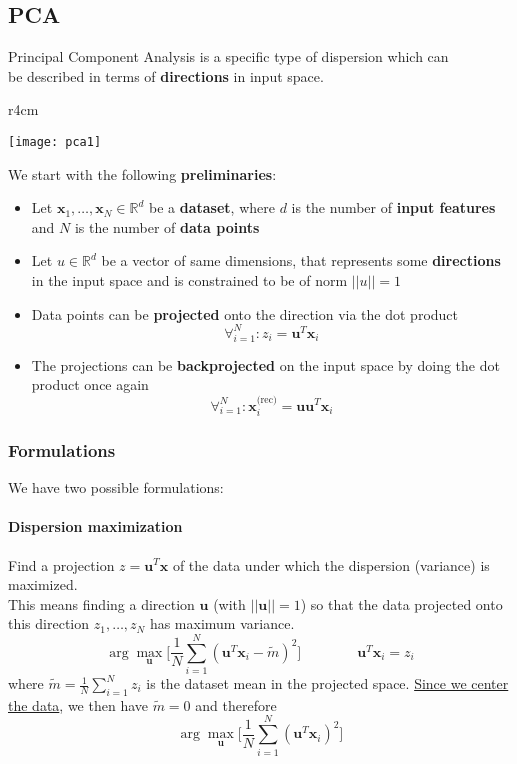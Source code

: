 \subsection{PCA}
Principal Component Analysis is a specific type of dispersion which can\\ be described in terms of \textbf{directions} in input space.\\
\begin{wrapfigure}[10]{r}{4cm}
	\vspace{-2.5cm}
	\begin{center}
		\texttt{[image: pca1]}
	\end{center}
\end{wrapfigure}
We start with the following \textbf{preliminaries}:
\begin{itemize}
	\item Let $\mathbf{x}_1, \ldots, \mathbf{x}_N \in \mathbb{R}^d$ be a \textbf{dataset}, where $d$ is the number of \textbf{input features} and $N$ is the number of \textbf{data points}
	\item Let $u \in \mathbb{R}^d$ be a vector of same dimensions, that represents some \textbf{directions} in the input space and is constrained to be of norm $\lvert\lvert u \rvert\rvert = 1$
	\item Data points can be \textbf{projected} onto the direction via the dot product
	\begin{equation}
		\forall_{i=1}^N : z_i = \mathbf{u}^T \mathbf{x}_i
	\end{equation}
	\item The projections can be \textbf{backprojected} on the input space by doing the dot product once again
	\begin{equation}
		\forall_{i=1}^N: \mathbf{x}_i^{\text{(rec)}} = \mathbf{u}\mathbf{u}^T \mathbf{x}_i
	\end{equation}
\end{itemize}
\subsubsection{Formulations}
We have two possible formulations:
\paragraph{Dispersion maximization} Find a projection $z = \mathbf{u}^T \mathbf{x}$ of the data under which the dispersion (variance) is maximized.\\
This means finding a direction $\mathbf{u}$ (with $\lvert\lvert \mathbf{u} \rvert\rvert = 1$) so that the data projected onto this direction $z_1, \ldots, z_N$ has maximum variance.
\begin{equation}
	\arg\max_\mathbf{u} \big[\frac{1}{N} \sum_{i=1}^N(\mathbf{u}^T\mathbf{x}_i-\tilde{m})^2\big] \qquad\qquad \mathbf{u}^T\mathbf{x}_i = z_i
\end{equation}
where $\tilde{m} = \frac{1}{N} \sum_{i=1}^Nz_i$ is the dataset mean in the projected space. \underline{Since we center the data}, we then have $\tilde{m}=0$ and therefore
\begin{equation}
	\label{eq:dispmax}
	\arg\max_\mathbf{u} \big[\frac{1}{N} \sum_{i=1}^N(\mathbf{u}^T\mathbf{x}_i)^2\big]
\end{equation}
